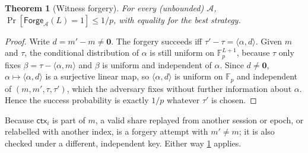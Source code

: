 \documentclass[11pt,a4paper]{article}
\theoremstyle{plain}
\newtheorem{theorem}{Theorem}
\theoremstyle{definition}
\newcommand{\F}{\mathbb{F}_p}
\newcommand{\ctx}{\mathsf{ctx}}
\providecommand{\adv}{\mathcal{A}}
\begin{document}
\begin{theorem}[Witness forgery]\label{thm:forge}
For every (unbounded) $\adv$, $\Pr[\mathsf{Forge}_\adv(L)=1]\le 1/p$, with equality for the best
strategy.
\end{theorem}
\begin{proof}
Write $d=m'-m\ne\mathbf 0$. The forgery succeeds iff $\tau'-\tau=\langle\alpha,d\rangle$. Given
$m$ and $\tau$, the conditional distribution of $\alpha$ is still uniform on $\F^{L+1}$, because
$\tau$ only fixes $\beta=\tau-\langle\alpha,m\rangle$ and $\beta$ is uniform and independent of
$\alpha$. Since $d\ne\mathbf 0$, $\alpha\mapsto\langle\alpha,d\rangle$ is a surjective linear map,
so $\langle\alpha,d\rangle$ is uniform on $\F$ and independent of $(m,m',\tau,\tau')$, which the
adversary fixes without further information about $\alpha$. Hence the success probability is
exactly $1/p$ whatever $\tau'$ is chosen.
\end{proof}

Because $\ctx_i$ is part of $m$, a valid share replayed from another session or epoch, or
relabelled with another index, is a forgery attempt with $m'\neq m$; it is also checked under a
different, independent key. Either way \cref{thm:forge} applies.
\end{document}

